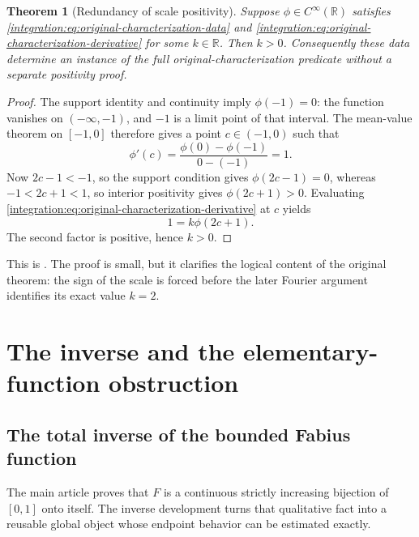 \documentclass[11pt,oneside]{article}
\newtheorem{theorem}{Theorem}[section]
\theoremstyle{definition}
\theoremstyle{remark}
\newcommand{\R}{\mathbb R}
\begin{document}
\begin{theorem}[Redundancy of scale positivity]
\label{integration:thm:scale-positive-redundant}
Suppose $\phi\in C^\infty(\R)$ satisfies
\eqref{integration:eq:original-characterization-data} and
\eqref{integration:eq:original-characterization-derivative} for some $k\in\R$.  Then $k>0$.
Consequently these data determine an instance of the full original-characterization predicate
without a separate positivity proof.
\end{theorem}

\begin{proof}
The support identity and continuity imply $\phi(-1)=0$: the function vanishes on
$(-\infty,-1)$, and $-1$ is a limit point of that interval.  The mean-value theorem on
$[-1,0]$ therefore gives a point $c\in(-1,0)$ such that
\begin{equation}
 \phi'(c)=\frac{\phi(0)-\phi(-1)}{0-(-1)}=1.
 \label{integration:eq:original-characterization-mvt}
\end{equation}
Now $2c-1<-1$, so the support condition gives $\phi(2c-1)=0$, whereas
$-1<2c+1<1$, so interior positivity gives $\phi(2c+1)>0$.  Evaluating
\eqref{integration:eq:original-characterization-derivative} at $c$ yields
\begin{equation}
 1=k\phi(2c+1).
 \label{integration:eq:original-characterization-positive-product}
\end{equation}
The second factor is positive, hence $k>0$.
\end{proof}

This is .  The proof is small, but it clarifies
the logical content of the original theorem: the sign of the scale is forced before the later
Fourier argument identifies its exact value $k=2$.

\section{The inverse and the elementary-function obstruction}

\subsection{The total inverse of the bounded Fabius function}
\label{integration:sec:inverse}

The main article proves that $F$ is a continuous strictly increasing bijection of $[0,1]$
onto itself.  The inverse development turns that qualitative fact into a reusable global
object whose endpoint behavior can be estimated exactly.
\end{document}

